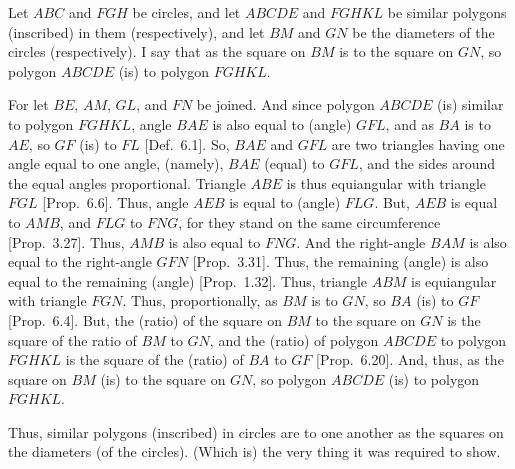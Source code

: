 \begin{Parallel}{}{}
{Let $ABC$ and $FGH$ be circles, and let $ABCDE$ and $FGHKL$ be
similar polygons (inscribed) in them (respectively), and let $BM$ and
$GN$ be the diameters of the circles (respectively). I say that as the square on
$BM$ is to the square on $GN$, so polygon $ABCDE$ (is) to polygon
$FGHKL$.

For let $BE$, $AM$, $GL$, and $FN$ be joined. And since polygon
$ABCDE$ (is) similar to polygon $FGHKL$, angle $BAE$ is also equal to
(angle) $GFL$, and as $BA$ is to $AE$, so $GF$ (is) to  $FL$ [Def.~6.1]. So, $BAE$ and $GFL$ are two triangles having one angle
equal to one angle, (namely), $BAE$ (equal) to $GFL$, and the sides
around the equal angles proportional. Triangle $ABE$ is thus equiangular with
triangle $FGL$ [Prop.~6.6]. Thus, angle $AEB$ is equal to
(angle) $FLG$. But, $AEB$ is equal to $AMB$, and $FLG$ to $FNG$, for they stand on the same
circumference [Prop.~3.27].
Thus, $AMB$ is also equal to $FNG$. And the right-angle $BAM$ is also
equal to the right-angle $GFN$ [Prop.~3.31]. 
Thus, the remaining (angle) is also equal to the remaining (angle) [Prop.~1.32]. Thus,
triangle $ABM$ is equiangular with triangle $FGN$. Thus, proportionally, as $BM$
is to $GN$, so $BA$ (is) to $GF$ [Prop.~6.4]. But, 
the (ratio) of the square on $BM$ to the square
on $GN$ is the square of the
ratio of $BM$ to $GN$, and  the (ratio) of
polygon $ABCDE$ to polygon $FGHKL$ is the square of the (ratio) of $BA$ to $GF$ [Prop.~6.20].  
And, thus, as the square on $BM$ (is) to the square on $GN$, so polygon $ABCDE$
(is) to polygon $FGHKL$. 

Thus, similar polygons (inscribed) in circles are to one another
as the squares on the diameters (of the circles). (Which is) the very thing it was required to
show.}
\end{Parallel}

